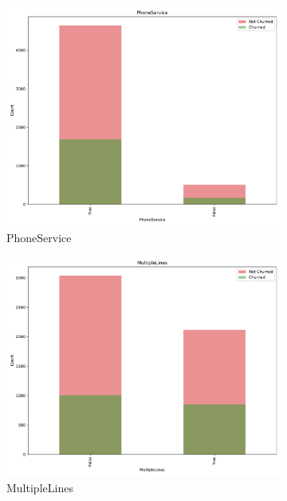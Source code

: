 \documentclass[a4paper,11pt]{article}
\begin{document}
\begin{landscape}
\begin{figure}
\begin{subfigure}{0.14\linewidth}
        \includegraphics[width=\linewidth]{figures/understanding/PhoneService.pdf}
        \caption{PhoneService}
    \end{subfigure}
    \begin{subfigure}{0.14\linewidth}
        \includegraphics[width=\linewidth]{figures/understanding/MultipleLines.pdf}
        \caption{MultipleLines}
    \end{subfigure}
    \begin{subfigure}{0.14\linewidth}

\end{subfigure}
\end{figure}
\end{landscape}
\end{document}
